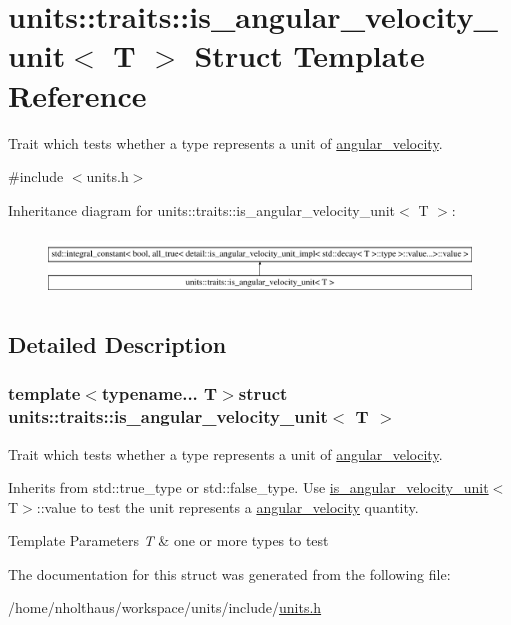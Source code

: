 \hypertarget{structunits_1_1traits_1_1is__angular__velocity__unit}{}\section{units\+:\+:traits\+:\+:is\+\_\+angular\+\_\+velocity\+\_\+unit$<$ T $>$ Struct Template Reference}
\label{structunits_1_1traits_1_1is__angular__velocity__unit}


Trait which tests whether a type represents a unit of \hyperlink{namespaceunits_1_1angular__velocity}{angular\+\_\+velocity}.  




{\ttfamily \#include $<$units.\+h$>$}

Inheritance diagram for units\+:\+:traits\+:\+:is\+\_\+angular\+\_\+velocity\+\_\+unit$<$ T $>$\+:\begin{figure}[H]
\begin{center}
\leavevmode
\includegraphics[height=1.632653cm]{structunits_1_1traits_1_1is__angular__velocity__unit}
\end{center}
\end{figure}


\subsection{Detailed Description}
\subsubsection*{template$<$typename... T$>$struct units\+::traits\+::is\+\_\+angular\+\_\+velocity\+\_\+unit$<$ T $>$}

Trait which tests whether a type represents a unit of \hyperlink{namespaceunits_1_1angular__velocity}{angular\+\_\+velocity}. 

Inherits from {\ttfamily std\+::true\+\_\+type} or {\ttfamily std\+::false\+\_\+type}. Use {\ttfamily \hyperlink{structunits_1_1traits_1_1is__angular__velocity__unit}{is\+\_\+angular\+\_\+velocity\+\_\+unit}$<$T$>$\+::value} to test the unit represents a \hyperlink{namespaceunits_1_1angular__velocity}{angular\+\_\+velocity} quantity. 
\begin{DoxyTemplParams}{Template Parameters}
{\em T} & one or more types to test \\
\hline
\end{DoxyTemplParams}


The documentation for this struct was generated from the following file\+:\begin{DoxyCompactItemize}
\item 
/home/nholthaus/workspace/units/include/\hyperlink{units_8h}{units.\+h}\end{DoxyCompactItemize}

